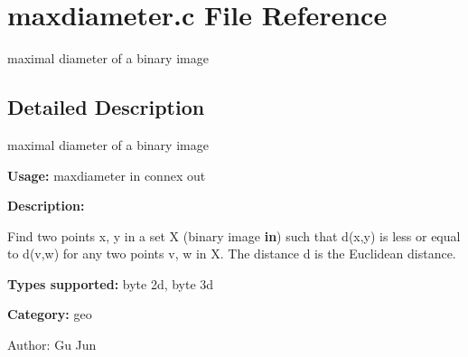 \section{maxdiameter.c File Reference}
\label{maxdiameter_8c}
maximal diameter of a binary image 



\subsection{Detailed Description}
maximal diameter of a binary image 

{\bf Usage:} maxdiameter in connex out

{\bf Description:}

Find two points x, y in a set X (binary image {\bf in}) such that d(x,y) is less or equal to d(v,w) for any two points v, w in X. The distance d is the Euclidean distance.

{\bf Types supported:} byte 2d, byte 3d

{\bf Category:} geo

\begin{Desc}
\item[Author:]Gu Jun \end{Desc}
